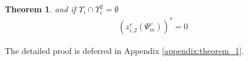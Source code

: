 \documentclass[10pt,journal, compsoc]{IEEEtran}
\newtheorem{theorem}{Theorem}
\begin{document}
\begin{theorem}
and if $\Upsilon_i \cap \Upsilon_i^2 = \emptyset$
\begin{equation}\label{eqn:asp_case2_optimal_solution_individual_rationality}
\begin{aligned}
    (z_{i,2}^{v}(\Psi_m^v))^*=0
\end{aligned}
\end{equation}

\end{theorem}
The detailed proof is deferred in Appendix \ref{appendix:theorem_1}.
\end{document}
